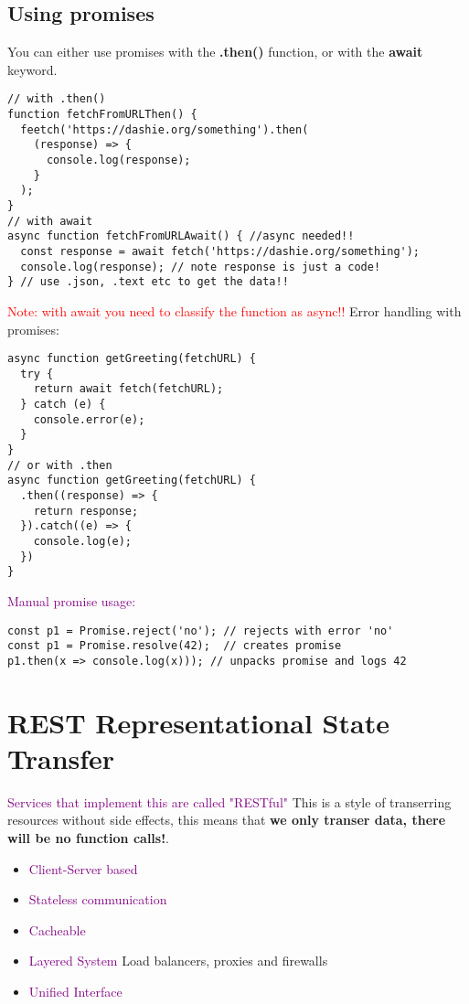 \documentclass[main.tex,fontsize=6pt,paper=a4,paper=landscape,DIV=calc,]{scrartcl}
\begin{document}
\begin{multicols*}{4}
\subsection{Using promises}  
You can either use promises with the \textbf{.then()} function, or with the \textbf{await} keyword.
\vspace{-2mm}
\begin{lstlisting}
// with .then()
function fetchFromURLThen() {
  feetch('https://dashie.org/something').then(
    (response) => {
      console.log(response);
    }
  );
}
// with await
async function fetchFromURLAwait() { //async needed!!
  const response = await fetch('https://dashie.org/something');
  console.log(response); // note response is just a code!
} // use .json, .text etc to get the data!!
\end{lstlisting}
\vspace{2mm}
\textcolor{red}{Note: with await you need to classify the function as async!!}\newline
Error handling with promises:\newline 
\vspace{-2mm}
\begin{lstlisting}
async function getGreeting(fetchURL) {
  try { 
    return await fetch(fetchURL); 
  } catch (e) {
    console.error(e);
  }
}
// or with .then
async function getGreeting(fetchURL) {
  .then((response) => {
    return response; 
  }).catch((e) => {
    console.log(e);
  })
}
\end{lstlisting}
\vspace{2mm}
\textcolor{purple}{Manual promise usage:}
\vspace{-2mm}
\begin{lstlisting}
const p1 = Promise.reject('no'); // rejects with error 'no'
const p1 = Promise.resolve(42);  // creates promise
p1.then(x => console.log(x))); // unpacks promise and logs 42
\end{lstlisting}
\vspace{2mm}

\section{REST Representational State Transfer}
\textcolor{purple}{Services that implement this are called "RESTful"}\newline
This is a style of transerring resources without side effects, this means that \textbf{we only transer data, there will be no function calls!}.
\begin{itemize}
\item \textcolor{purple}{Client-Server based}
\item \textcolor{purple}{Stateless communication}
\item \textcolor{purple}{Cacheable}
\item \textcolor{purple}{Layered System} Load balancers, proxies and firewalls
\item \textcolor{purple}{Unified Interface}
\end{itemize} 


\end{multicols*}
\end{document}
